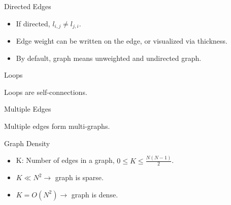 \documentclass{beamer}
\begin{document}

\begin{frame}{Directed Edges}
\begin{center}
\end{center}

\begin{itemize}
 \item If directed, $l_{i,j} \neq l_{j,i}$.
 \item Edge weight can be written on the edge, or visualized via thickness.
 \item By default, graph means unweighted and undirected graph.
\end{itemize}
\end{frame}


\begin{frame}{Loops}
\begin{center}
\end{center}

Loops are self-connections.

\end{frame}


\begin{frame}{Multiple Edges}
\begin{center}
\end{center}

Multiple edges form multi-graphs.
\end{frame}


\begin{frame}{Graph Density}
\begin{itemize}
 \item K: Number of edges in a graph, $0\leq K \leq \frac{N(N-1)}{2}$.
 \item $K \ll N^2 \rightarrow$ graph is sparse.
 \item $K = O(N^2) \rightarrow$ graph is dense.
\end{itemize}

\end{frame}
\end{document}
